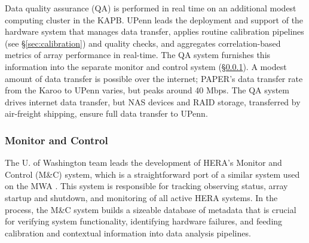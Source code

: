 \documentclass[preprint]{aastex}
\newcommand{\compress}{\vspace{-0.3in}}
\begin{document}
Data quality assurance (QA) is performed in real time on an additional modest 
computing cluster in the
KAPB.  UPenn leads the deployment and support of the hardware system that
manages data transfer, applies routine calibration pipelines (see \S\ref{sec:calibration}) and quality
checks, and aggregates correlation-based metrics of array performance in real-time.  The QA system
furnishes this information into the separate monitor and control system (\S\ref{sec:monitor}).
A modest amount of data transfer is possible over the internet; PAPER's data transfer rate from the Karoo
to UPenn varies, but peaks around 40 Mbps.  The QA system drives internet data transfer, but
NAS devices and RAID storage, transferred by air-freight shipping, ensure full data transfer to UPenn.




\compress
\subsubsection{Monitor and Control}
\label{sec:monitor}

The U. of Washington team leads the development of HERA's Monitor and Control (M\&C) system,
which is a straightforward port of a similar system used on the MWA \citep{tingay_et_al2013}.
This system is
responsible for tracking observing status, array startup and shutdown, and
monitoring of all active HERA systems. In the process, the M\&C system builds a sizeable database of 
metadata that is crucial for verifying system functionality, identifying hardware failures, and feeding
calibration and contextual information into data analysis pipelines.  
\end{document}
